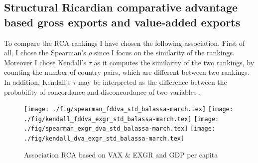 \subsection{Structural Ricardian comparative advantage based gross exports and value-added exports}
To compare the RCA rankings I have chosen the following association.
First of all, I chose the Spearman's $\rho$  since I focus on the similarity of the rankings.
Moreover I chose Kendall's $\tau$ as it computes the similarity of the two rankings, by counting the number of country pairs, which are different between two rankings.
In addition, Kendall's  $\tau$ may be interpreted as the difference between the probability of concordance and disconcordance of two variables \parencite{newson2parameters}.
\par 
\begin{figure}[H]
\caption{Association RCA based on VAX \& EXGR and GDP per capita }
\centering
\texttt{[image: ./fig/spearman\_fddva\_std\_balassa-march.tex]}
\texttt{[image: ./fig/kendall\_fddva\_exgr\_std\_balassa-march.tex]}
\texttt{[image: ./fig/spearman\_exgr\_dva\_std\_balassa-march.tex]}
\texttt{[image: ./fig/kendall\_dva\_exgr\_std\_balassa-march.tex]}
\end{figure}
